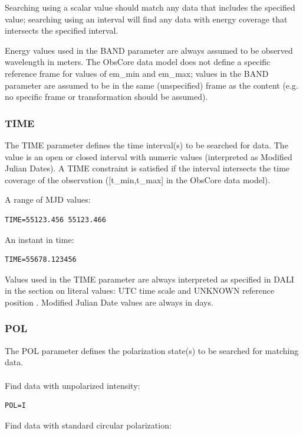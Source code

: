 \documentclass[11pt,a4paper]{ivoa}
\begin{document}
Searching using a scalar value should match any data that includes the specified value; searching using an interval will find any data with energy coverage that intersects the specified interval.

Energy values used in the BAND parameter are always assumed to be  observed wavelength in meters. The ObsCore data model does not define a specific reference frame for values of em\_min and em\_max; values in the BAND parameter are assumed to be in the same (unspecified) frame as the content (e.g. no specific frame or transformation should be assumed). 

\subsubsection{TIME}
\label{sec:TIME}

The TIME parameter defines the time interval(s) to be searched for data. The value is an open or closed interval with numeric values (interpreted as Modified Julian Dates). A TIME constraint is satisfied if the interval intersects the time coverage of the observation ([t\_min,t\_max] in the ObsCore data model).

A range of MJD values:

\begin{lstlisting}
TIME=55123.456 55123.466
\end{lstlisting}

An instant in time:

\begin{lstlisting}
TIME=55678.123456
\end{lstlisting}

Values used in the TIME parameter are always interpreted as specified in DALI in the section on literal values: UTC time scale and UNKNOWN reference position \citep{std:STC}. Modified Julian Date values are always in days.

\subsubsection{POL}
\label{sec:POL}

The POL parameter defines the polarization state(s) to be searched  for matching data.  \\ \\
Find data with unpolarized intensity:

\begin{lstlisting}
POL=I
\end{lstlisting}
Find data with standard circular polarization:
\end{document}
